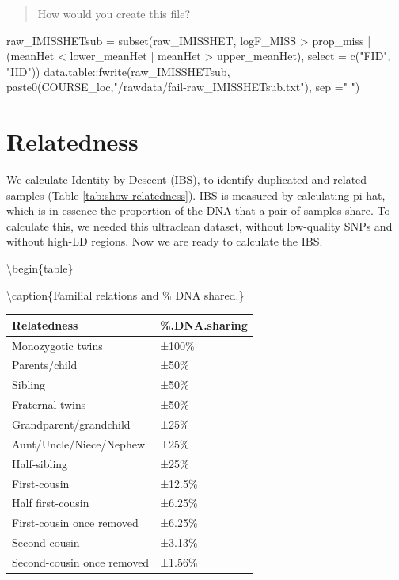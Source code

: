\documentclass[
]{book}
\newenvironment{Shaded}{\begin{snugshade}}{\end{snugshade}}
\newcommand{\AttributeTok}[1]{\textcolor[rgb]{0.77,0.63,0.00}{#1}}
\newcommand{\FunctionTok}[1]{\textcolor[rgb]{0.00,0.00,0.00}{#1}}
\newcommand{\NormalTok}[1]{#1}
\newcommand{\OtherTok}[1]{\textcolor[rgb]{0.56,0.35,0.01}{#1}}
\newcommand{\SpecialCharTok}[1]{\textcolor[rgb]{0.00,0.00,0.00}{#1}}
\newcommand{\StringTok}[1]{\textcolor[rgb]{0.31,0.60,0.02}{#1}}
\begin{document}
\begin{quote}
How would you create this file?
\end{quote}

\begin{Shaded}
\begin{Highlighting}[]
\NormalTok{raw\_IMISSHETsub }\OtherTok{=} \FunctionTok{subset}\NormalTok{(raw\_IMISSHET, logF\_MISS }\SpecialCharTok{\textgreater{}}\NormalTok{ prop\_miss }\SpecialCharTok{|}\NormalTok{ (meanHet }\SpecialCharTok{\textless{}}\NormalTok{ lower\_meanHet }\SpecialCharTok{|}\NormalTok{ meanHet }\SpecialCharTok{\textgreater{}}\NormalTok{ upper\_meanHet),}
                         \AttributeTok{select =} \FunctionTok{c}\NormalTok{(}\StringTok{"FID"}\NormalTok{, }\StringTok{"IID"}\NormalTok{))}
\NormalTok{data.table}\SpecialCharTok{::}\FunctionTok{fwrite}\NormalTok{(raw\_IMISSHETsub, }\FunctionTok{paste0}\NormalTok{(COURSE\_loc,}\StringTok{"/rawdata/fail{-}raw\_IMISSHETsub.txt"}\NormalTok{), }\AttributeTok{sep =}\StringTok{" "}\NormalTok{)}
\end{Highlighting}
\end{Shaded}

\hypertarget{relatedness}{%
\section{Relatedness}\label{relatedness}}

We calculate Identity-by-Descent (IBS), to identify duplicated and related samples (Table \ref{tab:show-relatedness}). IBS is measured by calculating pi-hat, which is in essence the proportion of the DNA that a pair of samples share. To calculate this, we needed this ultraclean dataset, without low-quality SNPs and without high-LD regions. Now we are ready to calculate the IBS.

\textbackslash begin\{table\}

\textbackslash caption\{\label{tab:show-relatedness}Familial relations and \% DNA shared.\}
\centering

\begin{tabular}[t]{l|l}
\hline
Relatedness & \%.DNA.sharing\\
\hline
Monozygotic twins & ±100\%\\
\hline
Parents/child & ±50\%\\
\hline
Sibling & ±50\%\\
\hline
Fraternal twins & ±50\%\\
\hline
Grandparent/grandchild & ±25\%\\
\hline
Aunt/Uncle/Niece/Nephew & ±25\%\\
\hline
Half-sibling & ±25\%\\
\hline
First-cousin & ±12.5\%\\
\hline
Half first-cousin & ±6.25\%\\
\hline
First-cousin once removed & ±6.25\%\\
\hline
Second-cousin & ±3.13\%\\
\hline
Second-cousin once removed & ±1.56\%\\
\hline
\end{tabular}
\end{document}
